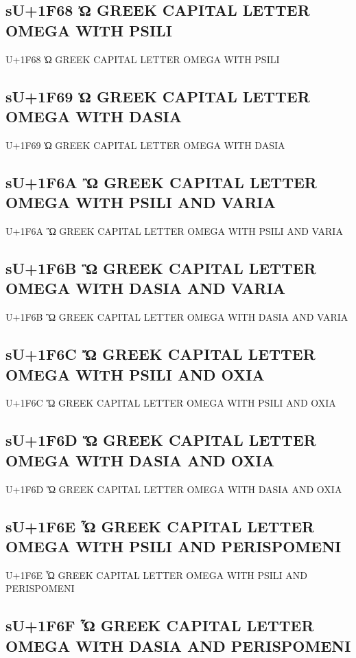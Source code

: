 \subsection{sU+1F68 Ὠ GREEK CAPITAL LETTER OMEGA WITH PSILI}

U+1F68 Ὠ GREEK CAPITAL LETTER OMEGA WITH PSILI

\subsection{sU+1F69 Ὡ GREEK CAPITAL LETTER OMEGA WITH DASIA}

U+1F69 Ὡ GREEK CAPITAL LETTER OMEGA WITH DASIA

\subsection{sU+1F6A Ὢ GREEK CAPITAL LETTER OMEGA WITH PSILI AND VARIA}

U+1F6A Ὢ GREEK CAPITAL LETTER OMEGA WITH PSILI AND VARIA

\subsection{sU+1F6B Ὣ GREEK CAPITAL LETTER OMEGA WITH DASIA AND VARIA}

U+1F6B Ὣ GREEK CAPITAL LETTER OMEGA WITH DASIA AND VARIA

\subsection{sU+1F6C Ὤ GREEK CAPITAL LETTER OMEGA WITH PSILI AND OXIA}

U+1F6C Ὤ GREEK CAPITAL LETTER OMEGA WITH PSILI AND OXIA

\subsection{sU+1F6D Ὥ GREEK CAPITAL LETTER OMEGA WITH DASIA AND OXIA}

U+1F6D Ὥ GREEK CAPITAL LETTER OMEGA WITH DASIA AND OXIA

\subsection{sU+1F6E Ὦ GREEK CAPITAL LETTER OMEGA WITH PSILI AND PERISPOMENI}

U+1F6E Ὦ GREEK CAPITAL LETTER OMEGA WITH PSILI AND PERISPOMENI

\subsection{sU+1F6F Ὧ GREEK CAPITAL LETTER OMEGA WITH DASIA AND PERISPOMENI}

